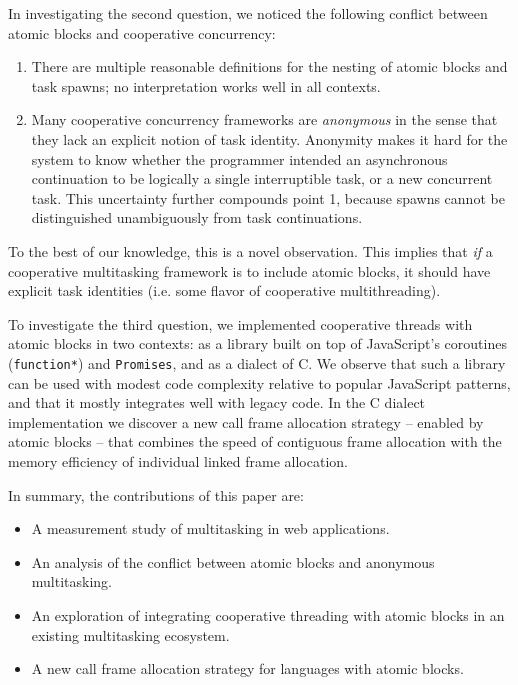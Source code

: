 \documentclass[acmsmall,anonymous,review]{acmart}\settopmatter{printfolios=true,printccs=false,printacmref=false}
\begin{document}

In investigating the second question, we noticed the following conflict between atomic blocks and cooperative concurrency:
\begin{enumerate}
\item There are multiple reasonable definitions for the nesting of atomic blocks and task spawns; no interpretation works well in all contexts.
\item Many cooperative concurrency frameworks are \emph{anonymous} in the sense that they lack an explicit notion of task identity.
  Anonymity makes it hard for the system to know whether the programmer intended an asynchronous continuation to be logically a single interruptible task, or a new concurrent task.
  This uncertainty further compounds point 1, because spawns cannot be distinguished unambiguously from task continuations.
\end{enumerate}
To the best of our knowledge, this is a novel observation.
This implies that \emph{if} a cooperative multitasking framework is to include atomic blocks, it should have explicit task identities (i.e. some flavor of cooperative multithreading).

To investigate the third question, we implemented cooperative threads with atomic blocks in two contexts: as a library built on top of JavaScript's coroutines (\texttt{function*}) and \texttt{Promises}, and as a dialect of C.
We observe that such a library can be used with modest code complexity relative to popular JavaScript patterns, and that it mostly integrates well with legacy code.
In the C dialect implementation we discover a new call frame allocation strategy -- enabled by atomic blocks -- that combines the speed of contiguous frame allocation with the memory efficiency of individual linked frame allocation.

In summary, the contributions of this paper are:
\begin{itemize}
\item A measurement study of multitasking in web applications.
\item An analysis of the conflict between atomic blocks and anonymous multitasking.
\item An exploration of integrating cooperative threading with atomic blocks in an existing multitasking ecosystem.
\item A new call frame allocation strategy for languages with atomic blocks.
\end{itemize}
\end{document}
